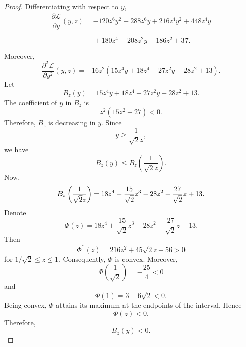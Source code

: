 \documentclass[11pt,a4paper]{article}
\numberwithin{equation}{section}
\numberwithin{table}{section}
\theoremstyle{plain}
\theoremstyle{definition}\newtheorem{definition}[theorem]{Definition}
\theoremstyle{remark}\newtheorem{remark}[theorem]{Remark}
\begin{document}
\begin{proof}
Differentiating with respect to $y$, 
\begin{equation*}
\begin{array}{l}
\dfrac{\partial \mathcal{L}}{\partial y}%
(y,z)=-120z^6y^2-288z^6y+216z^4y^2+448z^4y \\ 
\phantom{\dfrac{\partial \mathcal L}{\partial y}(y,z)=}{}%
+180z^4-208z^2y-186z^2+37.%
\end{array}%
\end{equation*}
Moreover, 
\begin{equation*}
\frac{\partial^2 \mathcal{L}}{\partial y^2}(y,z)=-16z^2%
\left(15z^4y+18z^4-27z^2y-28z^2+13\right).
\end{equation*}
Let 
\begin{equation*}
B_z(y)=15z^4y+18z^4-27z^2y-28z^2+13.
\end{equation*}
The coefficient of $y$ in $B_z$ is 
\begin{equation*}
z^2(15z^2-27)<0.
\end{equation*}
Therefore, $B_z$ is decreasing in $y$. Since 
\begin{equation*}
y\geq \frac1{\sqrt2 z},
\end{equation*}
we have 
\begin{equation*}
B_z(y)\leq B_z\left(\frac1{\sqrt2 z}\right).
\end{equation*}
Now, 
\begin{equation*}
B_z\left(\frac1{\sqrt2 z}\right)=18z^4+\frac{15}{\sqrt2}z^3-28z^2-\frac{27}{%
\sqrt2}z+13.
\end{equation*}
Denote 
\begin{equation*}
\Phi(z)=18z^4+\frac{15}{\sqrt2}z^3-28z^2-\frac{27}{\sqrt2}z+13.
\end{equation*}
Then 
\begin{equation*}
\Phi^{\prime\prime}(z)=216z^2+45\sqrt2 z-56>0
\end{equation*}
for $1/\sqrt2\leq z\leq1$. Consequently, $\Phi$ is convex.
Moreover, 
\begin{equation*}
\Phi\left(\frac1{\sqrt2}\right)=-\frac{25}{4}<0
\end{equation*}
and 
\begin{equation*}
\Phi(1)=3-6\sqrt2<0.
\end{equation*}
Being convex, $\Phi$ attains its maximum at the endpoints of the
interval. Hence 
\begin{equation*}
\Phi(z)<0.
\end{equation*}
Therefore, 
\begin{equation*}
B_z(y)<0.

\end{equation*}
\end{proof}
\end{document}
